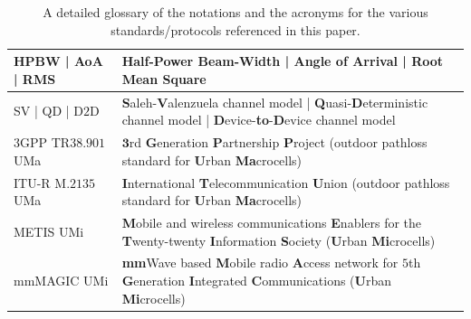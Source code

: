 \documentclass[10pt, twocolumn]{IEEEtran}
\begin{document}
\begin{table} [tb]
\begin{tabular}{|l||l|}
		\hline
        HPBW | AoA | RMS & \textbf{H}alf-\textbf{P}ower \textbf{B}eam-\textbf{W}idth | \textbf{A}ngle \textbf{o}f \textbf{A}rrival | \textbf{R}oot \textbf{M}ean \textbf{S}quare\\
		\hline
        SV | QD | D$2$D & \textbf{S}aleh-\textbf{V}alenzuela channel model | \textbf{Q}uasi-\textbf{D}eterministic channel model | \textbf{D}evice-\textbf{to}-\textbf{D}evice channel model\\
        \hline
        \hline
        $3$GPP TR$38.901$ UMa & $\mathbf{3}$rd \textbf{G}eneration \textbf{P}artnership \textbf{P}roject (outdoor pathloss standard for \textbf{U}rban \textbf{Ma}crocells)\\
		\hline
		ITU-R M$.2135$ UMa & \textbf{I}nternational \textbf{T}elecommunication \textbf{U}nion (outdoor pathloss standard for \textbf{U}rban \textbf{Ma}crocells)\\
		\hline
        METIS UMi & \textbf{M}obile and wireless communications \textbf{E}nablers for the \textbf{T}wenty-twenty \textbf{I}nformation \textbf{S}ociety (\textbf{U}rban \textbf{Mi}crocells)\\
        \hline
        mmMAGIC UMi & \textbf{mm}Wave based \textbf{M}obile radio \textbf{A}ccess network for $5$th \textbf{G}eneration \textbf{I}ntegrated \textbf{C}ommunications (\textbf{U}rban \textbf{Mi}crocells)\\
        \hline
	\end{tabular}
	\vspace{-1mm}
	\caption{A detailed glossary of the notations and the acronyms for the various standards/protocols referenced in this paper.}
    \vspace{-6mm}
	\label{T1}
\end{table}
\end{document}
